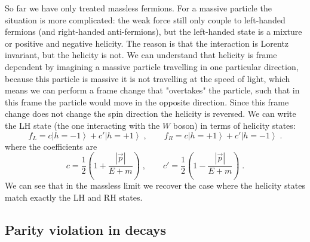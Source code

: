 \documentclass[12pt]{article}
\begin{document}
So far we have only treated massless fermions. For a massive particle the situation is more complicated: the weak force still only couple to left-handed fermions (and right-handed anti-fermions), but the left-handed state is a mixture or positive and negative helicity. The reason is that the interaction is Lorentz invariant, but the helicity is not. We can understand that helicity is frame dependent by imagining a massive particle travelling in one particular direction, because this particle is massive it is not travelling at the speed of light, which means we can perform a frame change that "overtakes" the particle, such that in this frame the particle would move in the opposite direction. Since this frame change does not change the spin direction the helicity is reversed. We can write the LH state (the one interacting with the $W$ boson) in terms of helicity states:
\begin{equation}
f_L=c\left|h=-1 \right> + c'\left|h=+1 \right>\;,
\qquad
f_R=c\left|h=+1 \right> + c'\left|h=-1 \right>\;.
\end{equation}\label{eq:fLRhel}
where the coefficients are 
\[
c=\frac{1}{2}\left(1+\frac{|\vec p|}{E+m}\right)\;,
\qquad
c'=\frac{1}{2}\left(1-\frac{|\vec p|}{E+m}\right)\;.
\]
We can see that in the massless limit we recover the case where the helicity states match exactly the LH and RH states.
%
%
\subsection{Parity violation in decays}
%
%
\end{document}
